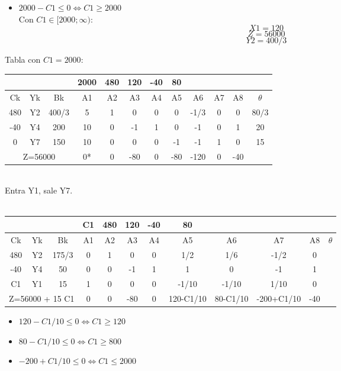 \documentclass{article}
\begin{document}
\begin{enumerate}
		\begin{itemize}
				\item $2000 - C1 \leq 0 \iff C1 \geq 2000$\\
					Con $C1 \in [2000; \infty)$:\\
					$$X1 = 120$$
					$$Z = 56000$$
					$$Y2 = 400/3$$
		\end{itemize}
		Tabla con $C1 = 2000$:\\
			\begin{tabular}{|c  c  c | c  c  c  c  c  c  c  c | c |}
			\hline
			 \multicolumn{3}{|c|}{} & 2000 & 480 & 120 & -40 & 80 & & & &\\ \hline
			 Ck & Yk & Bk & A1 & A2 & A3 & A4 & A5 & A6 & A7 & A8 & $\theta$\\ \hline 
			 480 & Y2 & 400/3 & 5 & 1 & 0 & 0 & 0 & -1/3 & 0 & 0 & $80/3$\\
			 -40 & Y4 & 200 & 10 & 0 & -1 & 1 & 0 & -1 & 0 & 1 & 20\\
			 0 & Y7 & 150 & 10 & 0 & 0 & 0 & -1 & -1 & 1 & 0 & 15\\ \hline
			 \multicolumn{3}{|c|}{Z=56000} & 0* & 0 & -80 & 0 & -80 & -120 & 0 & -40 &\\ \hline
		\end{tabular}
		\medskip\\
		Entra Y1, sale Y7.\\ 
		\smallskip\\
		\begin{tabular}{|c  c  c | c  c  c  c  c  c  c  c | c |}
			\hline
			 \multicolumn{3}{|c|}{} & C1 & 480 & 120 & -40 & 80 & & & &\\ \hline
			 Ck & Yk & Bk & A1 & A2 & A3 & A4 & A5 & A6 & A7 & A8 & $\theta$\\ \hline 
			 480 & Y2 & 175/3 & 0 & 1 & 0 & 0 & 1/2 & 1/6 & -1/2 & 0 & \\
			 -40 & Y4 & 50 & 0 & 0 & -1 & 1 & 1 & 0 & -1 & 1 & \\
			 C1 & Y1 & 15 & 1 & 0 & 0 & 0 & -1/10 & -1/10 & 1/10 & 0 & \\ \hline
			 \multicolumn{3}{|c|}{Z=56000 + 15 C1} & 0 & 0 & -80 & 0 & 120-C1/10 & 80-C1/10 & -200+C1/10 & -40 &\\ \hline
		\end{tabular}
		\begin{itemize}
				\item $120 - C1/10 \leq 0 \iff C1 \geq 120$
				\item $80 - C1/10 \leq 0 \iff C1 \geq 800$
				\item $-200 + C1/10 \leq 0 \iff C1 \leq 2000$

\end{itemize}
\end{enumerate}
\end{document}
